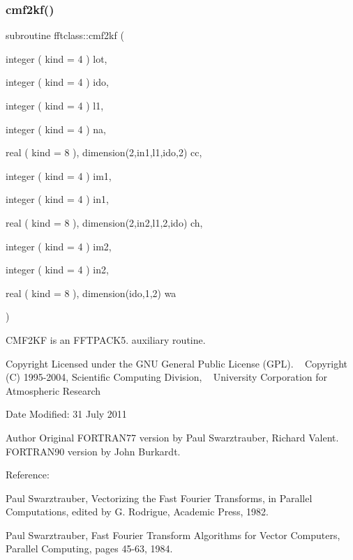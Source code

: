 \subsubsection{\texorpdfstring{cmf2kf()}{cmf2kf()}}
{\footnotesize\ttfamily subroutine fftclass\+::cmf2kf (\begin{DoxyParamCaption}\item[{integer ( kind = 4 )}]{lot,  }\item[{integer ( kind = 4 )}]{ido,  }\item[{integer ( kind = 4 )}]{l1,  }\item[{integer ( kind = 4 )}]{na,  }\item[{real ( kind = 8 ), dimension(2,in1,l1,ido,2)}]{cc,  }\item[{integer ( kind = 4 )}]{im1,  }\item[{integer ( kind = 4 )}]{in1,  }\item[{real ( kind = 8 ), dimension(2,in2,l1,2,ido)}]{ch,  }\item[{integer ( kind = 4 )}]{im2,  }\item[{integer ( kind = 4 )}]{in2,  }\item[{real ( kind = 8 ), dimension(ido,1,2)}]{wa }\end{DoxyParamCaption})}



C\+M\+F2\+KF is an F\+F\+T\+P\+A\+C\+K5. auxiliary routine. 

\begin{DoxyCopyright}{Copyright}
Licensed under the G\+NU General Public License (G\+PL). ~\newline
 Copyright (C) 1995-\/2004, Scientific Computing Division, ~\newline
 University Corporation for Atmospheric Research 
\end{DoxyCopyright}
\begin{DoxyDate}{Date}
Modified\+: 31 July 2011 
\end{DoxyDate}
\begin{DoxyAuthor}{Author}
Original F\+O\+R\+T\+R\+A\+N77 version by Paul Swarztrauber, Richard Valent. ~\newline
 F\+O\+R\+T\+R\+A\+N90 version by John Burkardt.
\end{DoxyAuthor}
\begin{DoxyVerb}  Reference:

    Paul Swarztrauber,
    Vectorizing the Fast Fourier Transforms,
    in Parallel Computations,
    edited by G. Rodrigue,
    Academic Press, 1982.

    Paul Swarztrauber,
    Fast Fourier Transform Algorithms for Vector Computers,
    Parallel Computing, pages 45-63, 1984.\end{DoxyVerb}
 

